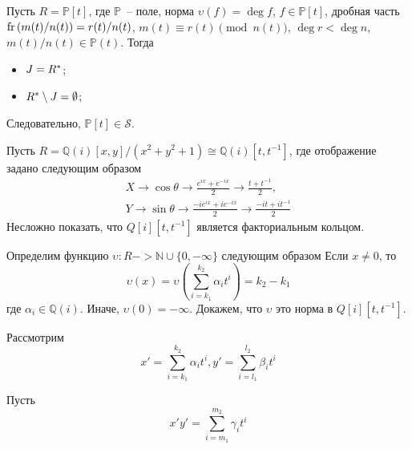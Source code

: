 \documentclass[_00_dissertation.tex]{subfiles}
\begin{document}
\begin{example}\label{example:P[t]}
    Пусть $R = \mathbb{P}[t]$, где $\mathbb{P}$~-- поле, норма $\upsilon(f)=\deg f$, $f \in \mathbb{P}[t]$, дробная часть $\textrm{fr}\left(m(t)/n(t)\right) = r(t)/n(t)$, $m(t)\equiv r(t) \pmod{n(t)}$, $\deg r < \deg n$, $m(t)/n(t) \in \mathbb{P}(t)$.
    Тогда
    \begin{itemize}
        \item $J = R^{*}$;

        \item $R^{*} \setminus J = \emptyset$;
    \end{itemize}

    Следовательно, $\mathbb{P}[t] \in \mathcal{S}$.
\end{example}

\begin{example}\label{example:coordinate_ring_of_circle}
    Пусть $R = \mathbb{Q}(i)[x, y]/(x^2 + y^2 + 1) \cong \mathbb{Q}(i)[t,  t^{-1}]$, где отображение задано следующим образом
    \begin{equation*}
        \begin{split}
            X \to \cos \theta \to \frac{e^{ix} + e^{-ix}}{2} \to \frac{t + t^{-1}}{2},\\
            Y \to \sin \theta \to \frac{-ie^{ix} + ie^{-ix}}{2} \to \frac{-it + it^{-1}}{2}
        \end{split}
    \end{equation*}
    Несложно показать, что $Q[i][t, t^{-1}]$ является факториальным кольцом.
    
    Определим функцию $\upsilon : R -> \mathbb{N} \cup \{0, -\infty\}$ следующим образом
    Если $x \neq 0$, то
    \begin{equation*}
        \upsilon(x) = \upsilon\left(
            \sum_{i=k_1}^{k_2} \alpha_i t^i
        \right) = k_2 - k_1
    \end{equation*}
    где $\alpha_i \in \mathbb{Q}(i)$.
    Иначе, $\upsilon(0) = -\infty$.
    Докажем, что $\upsilon$ это норма в $Q[i][t, t^{-1}]$.

    Рассмотрим
    \begin{equation*}
        x' = \sum_{i=k_1}^{k_2} \alpha_i t^i,
        y' = \sum_{i=l_1}^{l_2} \beta_i t^i
    \end{equation*}

    Пусть
    \begin{equation*}
        x'y' = \sum_{i=m_1}^{m_2} \gamma_i t^i
    \end{equation*}


\end{example}
\end{document}
